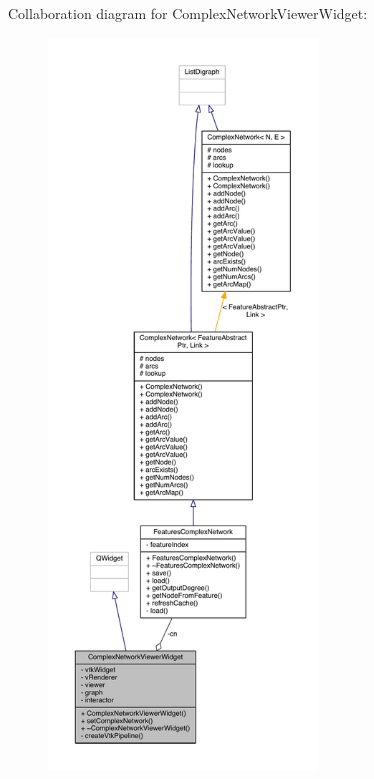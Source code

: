 Collaboration diagram for Complex\+Network\+Viewer\+Widget\+:
\nopagebreak
\begin{figure}[H]
\begin{center}
\leavevmode
\includegraphics[height=550pt]{class_complex_network_viewer_widget__coll__graph}
\end{center}
\end{figure}



